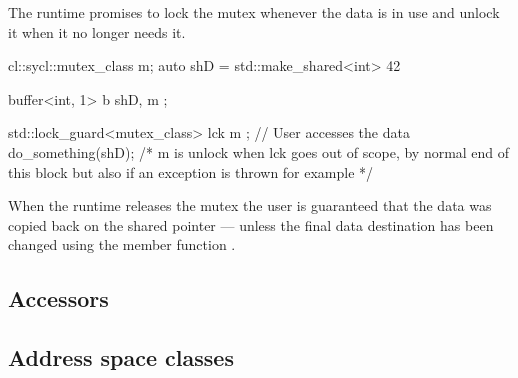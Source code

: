 The runtime promises to lock the mutex whenever the data is in use and
unlock it when it no longer needs it.

\begin{code}
{
  cl::sycl::mutex_class m;
  auto shD = std::make_shared<int> { 42 }
  {
    buffer<int, 1> b { shD, m };

    std::lock_guard<mutex_class> lck { m };
    // User accesses the data
    do_something(shD);
    /* m is unlock when lck goes out of scope, by normal end of this
       block but also if an exception is thrown for example */
  }
}
\end{code}

When the runtime releases the mutex the user is guaranteed that the data was
copied back on the shared pointer --- unless the final data destination has been
changed using the member function .

\subsection{Accessors}
\label{subsec:accessors}




\subsection{Address space classes}

